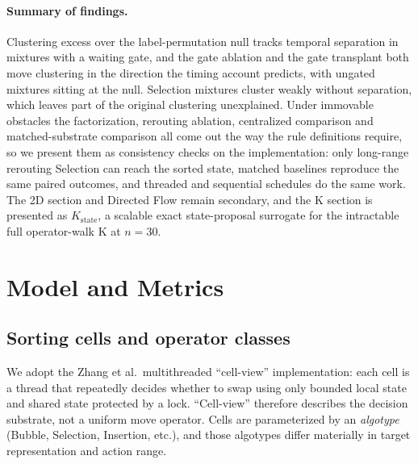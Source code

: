 \documentclass[11pt]{article}
\begin{document}
\paragraph{Summary of findings.}
Clustering excess over the label-permutation null tracks temporal separation in mixtures with a
waiting gate, and the gate ablation and the gate transplant both move clustering in the direction
the timing account predicts, with ungated mixtures sitting at the null. Selection mixtures cluster
weakly without separation, which leaves part of the original clustering unexplained. Under
immovable obstacles the factorization, rerouting ablation, centralized comparison and
matched-substrate comparison all come out the way the rule definitions require, so we present them
as consistency checks on the implementation: only long-range rerouting Selection can reach the
sorted state, matched baselines reproduce the same paired outcomes, and threaded and sequential
schedules do the same work. The 2D section and Directed Flow remain secondary, and the K section
is presented as $K_{\mathrm{state}}$, a scalable exact state-proposal surrogate for the
intractable full operator-walk K at $n=30$.

\section{Model and Metrics}
\label{sec:methods}
\subsection{Sorting cells and operator classes}
We adopt the Zhang et al.\ multithreaded ``cell-view'' implementation: each cell is a thread that
repeatedly decides whether to swap using only bounded local state and shared state protected by a
lock. ``Cell-view'' therefore describes the decision substrate, not a uniform move operator.
Cells are parameterized by an \emph{algotype} (Bubble, Selection, Insertion, etc.), and those
algotypes differ materially in target representation and action range.
\end{document}
